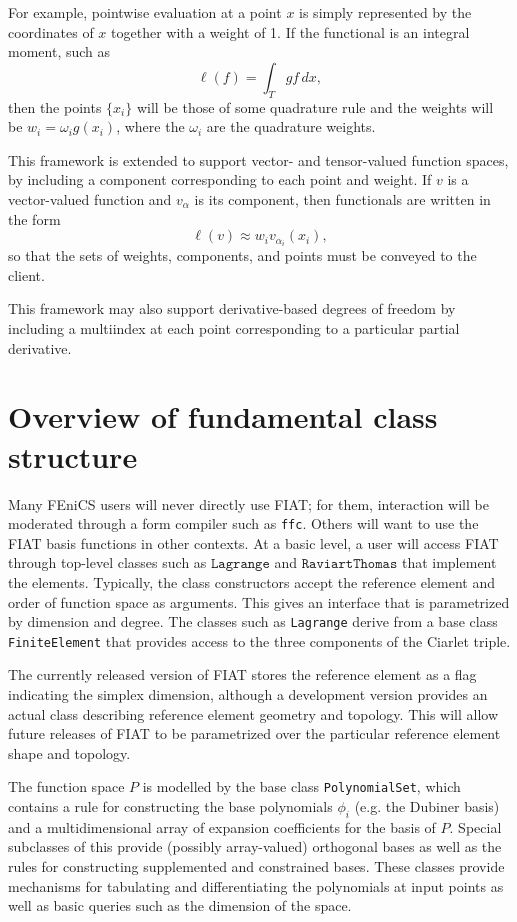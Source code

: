 For example, pointwise evaluation at a point \( x \) is simply
represented by the coordinates of \( x \) together with a weight of
1. If the functional is an integral moment, such as
\[
\ell( f ) = \int_T g f \, dx,
\]
then the points \( \{ x_i \} \) will be those of some quadrature rule
and the weights will be \( w_i = \omega_i g(x_i) \), where the \(
\omega_i \) are the quadrature weights.

This framework is extended to support vector- and tensor-valued
function spaces, by including a component corresponding to each point
and weight.  If \( v \) is a vector-valued function and \( v_\alpha \)
is its component, then functionals are written in the form
\[
\ell( v ) \approx w_i v_{\alpha_i}(x_i),
\]
so that the sets of weights, components, and points must be conveyed
to the client.

This framework may also support derivative-based degrees of freedom by
including a multiindex at each point corresponding to a particular
partial derivative.



\section{Overview of fundamental class structure}
Many FEniCS users will never directly use FIAT; for them, interaction will be
moderated through a form compiler such as \texttt{ffc}.  Others will
want to use the FIAT basis functions in other contexts.
At a basic level, a user will access FIAT through top-level classes such as \(
\texttt{Lagrange} \) and \( \texttt{RaviartThomas} \) that implement
the elements.  Typically, the class
constructors accept the reference element and order of function space as
arguments.  This gives an interface that is parametrized by dimension
and degree.  The classes such as \texttt{Lagrange} derive from a base class
\texttt{FiniteElement} that provides access to the three components of
the Ciarlet triple.

The currently released version of FIAT stores the
reference element as a flag indicating the simplex dimension, although
a development version provides an actual class describing reference
element geometry and topology.  This will allow future releases of
FIAT to be parametrized over the particular reference element shape
and topology.

The function space \( P \) is modelled by the base class
\texttt{PolynomialSet}, which contains a rule for
constructing the base polynomials \( \phi_i \) (e.g. the Dubiner
basis) and a multidimensional
array of expansion coefficients for the basis of \( P \).  Special
subclasses of this provide (possibly array-valued) orthogonal bases as
well as the rules for constructing supplemented and constrained
bases.  These classes provide mechanisms for tabulating and
differentiating the polynomials at input points as well as basic
queries such as the dimension of the space.

